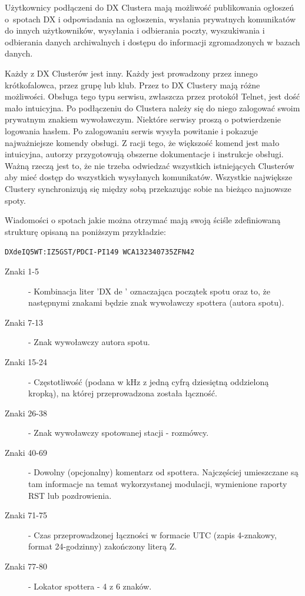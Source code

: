 \documentclass[]{mgr}
\begin{document}
        Użytkownicy podłączeni do DX Clustera mają możliwość publikowania ogłoszeń o~spotach DX i odpowiadania na ogłoszenia, wysłania prywatnych komunikatów do innych użytkowników, wysyłania i odbierania poczty, wyszukiwania i odbierania danych archiwalnych i dostępu do informacji zgromadzonych w bazach danych.

        Każdy z DX Clusterów jest inny. Każdy jest prowadzony przez innego krótkofalowca, przez grupę lub klub. Przez to DX Clustery mają różne możliwości. Obsługa tego typu serwisu, zwłaszcza przez protokół Telnet, jest dość mało intuicyjna. Po podłączeniu do Clustera należy się do niego zalogować swoim prywatnym znakiem wywoławczym. Niektóre serwisy proszą o potwierdzenie logowania hasłem. Po zalogowaniu serwis wysyła powitanie i pokazuje najważniejsze komendy obsługi. Z racji tego, że większość komend jest mało intuicyjna, autorzy przygotowują obszerne dokumentacje i instrukcje obsługi. Ważną rzeczą jest to, że nie trzeba odwiedzać wszystkich istniejących Clusterów aby mieć dostęp do wszystkich wysyłanych komunikatów. Wszystkie największe Clustery synchronizują się między sobą przekazując sobie na bieżąco najnowsze spoty.

        Wiadomości o spotach jakie można otrzymać mają swoją ściśle zdefiniowaną strukturę opisaną na poniższym przykładzie:

        \noindent\texttt{DX\space de\space IQ5WT:\space\space\space\space{}\space\space IZ5GST/P\space\space\space\space\space DCI-PI149 WCA13234\space\space\space\space\space\space\space\space 0735Z\space FN42}

        \begin{description}
            \item[Znaki 1-5] - Kombinacja liter 'DX de ' oznaczająca początek spotu oraz to, że następnymi znakami będzie znak wywoławczy spottera (autora spotu).
            \item[Znaki 7-13] - Znak wywoławczy autora spotu.
            \item[Znaki 15-24] - Częstotliwość (podana w kHz z jedną cyfrą dziesiętną oddzieloną kropką), na której przeprowadzona została łączność.
            \item[Znaki 26-38] - Znak wywoławczy spotowanej stacji - rozmówcy.
            \item[Znaki 40-69] - Dowolny (opcjonalny) komentarz od spottera. Najczęściej umieszczane są tam informacje na temat wykorzystanej modulacji, wymienione raporty RST lub pozdrowienia.
            \item[Znaki 71-75] - Czas przeprowadzonej łączności w formacie UTC (zapis 4-znakowy, format 24-godzinny) zakończony literą Z.
            \item[Znaki 77-80] - Lokator spottera - 4 z 6 znaków.
        \end{description}
\end{document}
